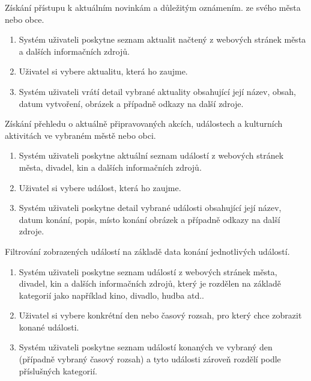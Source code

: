 
Získání přístupu k aktuálním novinkám a důležitým oznámením. 
ze svého města nebo obce. %

\begin{enumerate}
  \item Systém uživateli poskytne seznam aktualit načtený z webových stránek města a dalších informačních zdrojů.
  \item Uživatel si vybere aktualitu, která ho zaujme.
  \item Systém uživateli vrátí detail vybrané aktuality obsahující její název, obsah, datum vytvoření, obrázek a případně odkazy na další zdroje.
\end{enumerate}

Získání přehledu o aktuálně připravovaných akcích, událostech a kulturních 
aktivitách ve vybraném městě nebo obci. 

\begin{enumerate}
  \item Systém uživateli poskytne aktuální seznam událostí z webových stránek města, divadel, kin a dalších informačních zdrojů.
  \item Uživatel si vybere událost, která ho zaujme.
  \item Systém uživateli poskytne detail vybrané události obsahující její název, datum konání, popis, místo konání obrázek a případně odkazy na další zdroje.
\end{enumerate}

Filtrování zobrazených událostí na základě data konání jednotlivých událostí.

\begin{enumerate}
  \item Systém uživateli poskytne seznam událostí z webových stránek města, divadel, kin a dalších informačních zdrojů, který 
  je rozdělen na základě kategorií jako například kino, divadlo, hudba atd..
  \item Uživatel si vybere konkrétní den nebo časový rozsah, pro který chce zobrazit konané události.
  \item Systém uživateli poskytne seznam událostí konaných ve vybraný den (případně vybraný časový rozsah) a tyto události zároveň
  rozdělí podle příslušných kategorií.
\end{enumerate}

